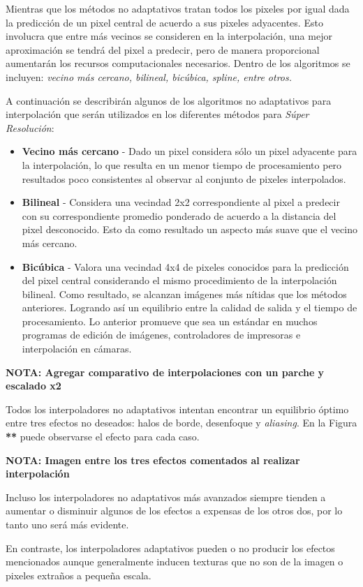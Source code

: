 Mientras que los métodos no adaptativos tratan todos los pixeles por igual
dada la predicción de un pixel central de acuerdo a sus pixeles adyacentes. Esto 
involucra que entre más vecinos se consideren en la interpolación, una mejor 
aproximación se tendrá del pixel a predecir, pero de manera proporcional 
aumentarán los recursos computacionales necesarios. Dentro de los algoritmos 
se incluyen: \emph{vecino más cercano, bilineal, bicúbica, spline, entre otros.}

A continuación se describirán algunos de los algoritmos no adaptativos para 
interpolación que serán utilizados en los diferentes métodos para \emph{Súper
Resolución}:
\begin{itemize}
    \item \textbf{Vecino más cercano} - Dado un pixel considera sólo un pixel 
    adyacente para la interpolación, lo que resulta en un menor tiempo de procesamiento
    pero resultados poco consistentes al observar al conjunto de pixeles interpolados. 
    \item \textbf{Bilineal} - Considera una vecindad 2x2 correspondiente al pixel
    a predecir con su correspondiente promedio ponderado de acuerdo a la distancia
    del pixel desconocido. Esto da como resultado un aspecto más suave que el vecino
    más cercano. 
    \item \textbf{Bicúbica} - Valora una vecindad 4x4 de pixeles conocidos para la
    predicción del pixel central considerando el mismo procedimiento de la 
    interpolación bilineal. Como resultado, se alcanzan imágenes más nítidas que los 
    métodos anteriores. Logrando así un equilibrio entre la calidad de salida y el 
    tiempo de procesamiento. Lo anterior promueve que sea un estándar en muchos programas
    de edición de imágenes, controladores de impresoras e interpolación en cámaras. 
\end{itemize}

\textbf{NOTA: Agregar comparativo de interpolaciones con un parche y escalado x2}

Todos los interpoladores no adaptativos intentan encontrar un equilibrio óptimo
entre tres efectos no deseados: halos de borde, desenfoque y \emph{aliasing}. En la 
Figura \textbf{**} puede observarse el efecto para cada caso. 

\textbf{NOTA: Imagen entre los tres efectos comentados al realizar interpolación}

Incluso los interpoladores no adaptativos más avanzados siempre tienden a aumentar
o disminuir algunos de los efectos a expensas de los otros dos, por lo tanto uno 
será más evidente. 

En contraste, los interpoladores adaptativos pueden o no producir los efectos 
mencionados aunque generalmente inducen texturas que no son de la imagen o 
pixeles extraños a pequeña escala.

